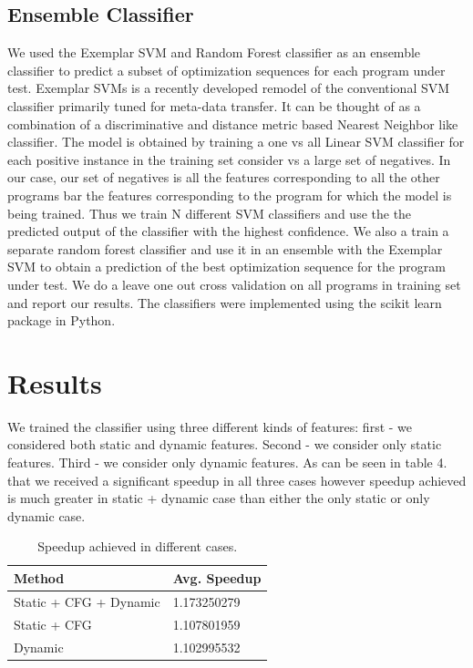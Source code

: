 \documentclass[10pt]{sigplanconf}
\begin{document}
\subsection{ Ensemble Classifier }
We used the Exemplar SVM and Random Forest classifier as an ensemble classifier to predict a subset of optimization sequences for each program under test. Exemplar SVMs is a recently developed remodel of the conventional SVM classifier primarily tuned for meta-data transfer. It can be thought of as a combination of a discriminative and distance metric based Nearest Neighbor like classifier. The model is obtained by training a one vs all Linear SVM classifier for each positive instance in the training set consider vs a large set of negatives. In our case, our set of negatives is all the features corresponding to all the other programs bar the features corresponding to the program for which the model is being trained. Thus we train N different SVM classifiers and use the the predicted output of the classifier with the highest confidence. We also a train a separate random forest classifier and use it in an ensemble with the Exemplar SVM to obtain a prediction of the best optimization sequence for the program under test. We do a leave one out cross validation on all programs in training set and report our results. The classifiers were implemented using the scikit learn package in Python.



\section{Results}
We trained the classifier using three different kinds of features: first - we considered both static and dynamic features. Second - we consider only static features. Third - we consider only dynamic features. As can be seen in table 4. that we received a significant speedup in all three cases however speedup achieved is much greater in static + dynamic case than either the only static or only dynamic case.


\begin{table}[tbl4]
\caption{Speedup achieved in different cases.}
\begin{tabular} {|p{12em}|p{9em}|}
\hline

\bf{Method} & \bf{Avg. Speedup} \\ \hline
Static + CFG + Dynamic & 1.173250279 \\ \hline
Static + CFG & 1.107801959 \\ \hline
Dynamic & 1.102995532 \\ \hline

\end{tabular}
\label{tb:tbl4}
\end{table}
\end{document}
